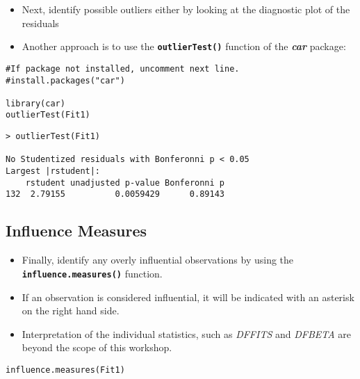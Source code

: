 \documentclass[a4paper,12pt]{article}
\begin{document}
\begin{itemize}
\item Next, identify possible outliers either by looking at the diagnostic plot of the residuals
\newpage
\item Another approach is to use the \texttt{\textbf{outlierTest()}} function of the \textit{\textbf{car}} package:

\end{itemize}

\begin{framed}
\begin{verbatim}
#If package not installed, uncomment next line.
#install.packages("car")

library(car)
outlierTest(Fit1)
\end{verbatim} 
\end{framed}
\begin{verbatim}
> outlierTest(Fit1)

No Studentized residuals with Bonferonni p < 0.05
Largest |rstudent|:
    rstudent unadjusted p-value Bonferonni p
132  2.79155          0.0059429      0.89143

\end{verbatim}
\newpage
\subsection{Influence Measures}
\begin{itemize}
\item Finally, identify any overly influential observations by using the \texttt{\textbf{influence.measures()}} 
function.
\item If an observation is considered influential, it will be indicated with an asterisk on the right hand side. \item Interpretation of the individual statistics, such as \textit{DFFITS} and \textit{DFBETA} are beyond the scope of this workshop.
\end{itemize}


\begin{framed}
\begin{verbatim}
influence.measures(Fit1)
\end{verbatim} 
\end{framed}
\end{document}
